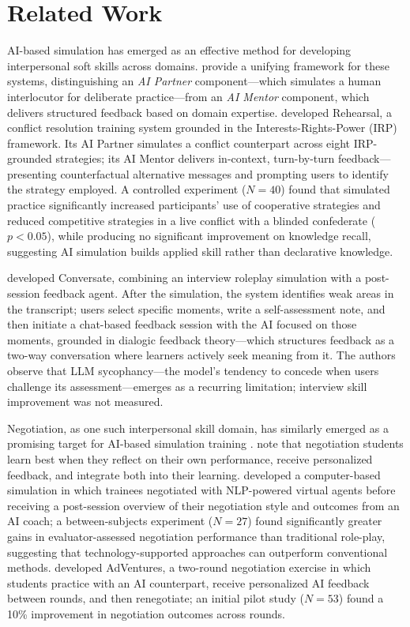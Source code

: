 \section{Related Work}

AI-based simulation has emerged as an effective method for developing interpersonal soft skills across domains. \citet{yang2024} provide a unifying framework for these systems, distinguishing an \textit{AI Partner} component---which simulates a human interlocutor for deliberate practice---from an \textit{AI Mentor} component, which delivers structured feedback based on domain expertise. \citet{shaikh2024} developed Rehearsal, a conflict resolution training system grounded in the Interests-Rights-Power (IRP) framework. Its AI Partner simulates a conflict counterpart across eight IRP-grounded strategies; its AI Mentor delivers in-context, turn-by-turn feedback---presenting counterfactual alternative messages and prompting users to identify the strategy employed. A controlled experiment ($N=40$) found that simulated practice significantly increased participants' use of cooperative strategies and reduced competitive strategies in a live conflict with a blinded confederate ($p < 0.05$), while producing no significant improvement on knowledge recall, suggesting AI simulation builds applied skill rather than declarative knowledge.

\citet{daryanto2025} developed Conversate, combining an interview roleplay simulation with a post-session feedback agent. After the simulation, the system identifies weak areas in the transcript; users select specific moments, write a self-assessment note, and then initiate a chat-based feedback session with the AI focused on those moments, grounded in dialogic feedback theory---which structures feedback as a two-way conversation where learners actively seek meaning from it. The authors observe that LLM sycophancy---the model's tendency to concede when users challenge its assessment---emerges as a recurring limitation; interview skill improvement was not measured.

Negotiation, as one such interpersonal skill domain, has similarly emerged as a promising target for AI-based simulation training \citep{dannenmann2022, rottner2024}. \citet{dinnar2021} note that negotiation students learn best when they reflect on their own performance, receive personalized feedback, and integrate both into their learning. \citet{dannenmann2022} developed a computer-based simulation in which trainees negotiated with NLP-powered virtual agents before receiving a post-session overview of their negotiation style and outcomes from an AI coach; a between-subjects experiment ($N=27$) found significantly greater gains in evaluator-assessed negotiation performance than traditional role-play, suggesting that technology-supported approaches can outperform conventional methods. \citet{rottner2024} developed AdVentures, a two-round negotiation exercise in which students practice with an AI counterpart, receive personalized AI feedback between rounds, and then renegotiate; an initial pilot study ($N=53$) found a 10\% improvement in negotiation outcomes across rounds.

